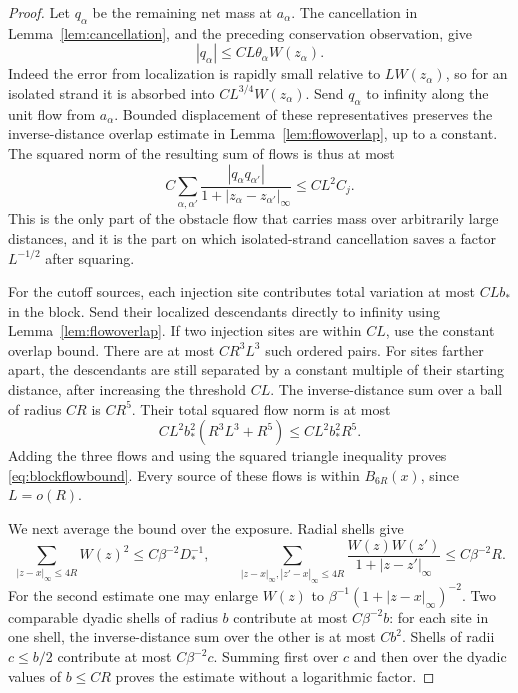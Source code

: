 \begin{proof}
Let \(q_\alpha\) be the remaining net mass at \(a_\alpha\).
The cancellation in Lemma~\ref{lem:cancellation}, and the preceding
conservation observation, give
\[
 |q_\alpha|\le CL\theta_\alpha W(z_\alpha).
\]
Indeed the error from localization is rapidly small relative to
\(LW(z_\alpha)\), so for an isolated strand it is absorbed into
\(CL^{3/4}W(z_\alpha)\).  Send \(q_\alpha\) to infinity along
the unit flow from \(a_\alpha\).  Bounded displacement of these
representatives preserves the inverse-distance overlap estimate in
Lemma~\ref{lem:flowoverlap}, up to a constant.  The squared norm of
the resulting sum of flows is thus at most
\begin{equation}\label{eq:blocknetflow}
 C\sum_{\alpha,\alpha'}
 \frac{|q_\alpha q_{\alpha'}|}
 {1+|z_\alpha-z_{\alpha'}|_\infty}
 \le CL^2C_j.
\end{equation}
This is the only part of the obstacle flow that carries mass over arbitrarily
large distances, and it is the part on which isolated-strand
cancellation saves a factor \(L^{-1/2}\) after squaring.

For the cutoff sources, each injection site contributes total variation
at most \(CLb_*\) in the block.  Send their localized descendants
directly to infinity using Lemma~\ref{lem:flowoverlap}.  If two
injection sites are within \(CL\), use the constant overlap bound.
There are at most \(CR^3L^3\) such ordered pairs.  For sites farther
apart, the descendants are still separated by a constant multiple of
their starting distance, after increasing the threshold \(CL\).
The inverse-distance sum over a ball of radius \(CR\) is \(CR^5\).
Their total squared flow norm is at most
\begin{equation}\label{eq:blockcutoffflow}
 CL^2b_*^2(R^3L^3+R^5)\le CL^2b_*^2R^5.
\end{equation}
Adding the three flows and using the squared triangle inequality proves
\eqref{eq:blockflowbound}.  Every source of these flows is within
\(B_{6R}(x)\), since \(L=o(R)\).

We next average the bound over the exposure.  Radial shells give
\begin{equation}\label{eq:weightenergysums}
 \sum_{|z-x|_\infty\le4R}W(z)^2
 \le C\beta^{-2}D_*^{-1},
 \qquad
 \sum_{|z-x|_\infty,|z'-x|_\infty\le4R}
 \frac{W(z)W(z')}{1+|z-z'|_\infty}
 \le C\beta^{-2}R.
\end{equation}
For the second estimate one may enlarge \(W(z)\) to
\(\beta^{-1}(1+|z-x|_\infty)^{-2}\).
Two comparable dyadic shells of radius \(b\) contribute at most
\(C\beta^{-2}b\): for each site in one shell, the inverse-distance
sum over the other is at most \(Cb^2\).
Shells of radii \(c\le b/2\) contribute at most
\(C\beta^{-2}c\).  Summing first over \(c\) and then over the
dyadic values of \(b\le CR\) proves the estimate without a
logarithmic factor.


\end{proof}
